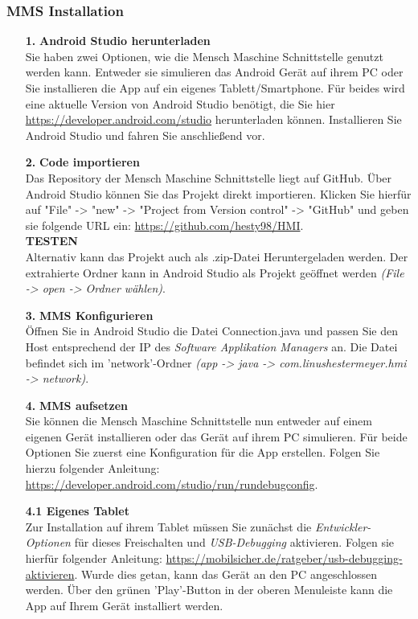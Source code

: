 \subsubsection{MMS Installation}
\begin{itemize}
	\item[\textbf{1.}] \textbf{Android Studio herunterladen}\\
	Sie haben zwei Optionen, wie die Mensch Maschine Schnittstelle genutzt werden kann. Entweder sie simulieren das Android Gerät auf ihrem PC oder Sie installieren die App auf ein eigenes Tablett/Smartphone. Für beides wird eine aktuelle Version von Android Studio benötigt, die Sie hier \url{https://developer.android.com/studio} herunterladen können. Installieren Sie Android Studio und fahren Sie anschließend vor.

	\item[\textbf{2.}] \textbf{Code importieren}\\
	Das Repository der Mensch Maschine Schnittstelle liegt auf GitHub. Über Android Studio können Sie das Projekt direkt importieren. Klicken Sie hierfür auf "File" -> "new" -> "Project from Version control" -> "GitHub" und geben sie folgende URL ein: \url{https://github.com/hesty98/HMI}.\\
	
	\textbf{TESTEN}\\
	
	Alternativ kann das Projekt auch als .zip-Datei Heruntergeladen werden. Der extrahierte Ordner kann in Android Studio als Projekt geöffnet werden \textit{(File -> open -> Ordner wählen)}.
	
	\item[\textbf{3.}] \textbf{MMS Konfigurieren}\\
	Öffnen Sie in Android Studio die Datei Connection.java und passen Sie den Host entsprechend der IP des \textit{Software Applikation Managers} an. Die Datei befindet sich im 'network'-Ordner \textit{(app -> java -> com.linushestermeyer.hmi -> network)}.
	
	\item[\textbf{4.}] \textbf{MMS aufsetzen}\\
	Sie können die Mensch Maschine Schnittstelle nun entweder auf einem eigenen Gerät installieren oder das Gerät auf ihrem PC simulieren. Für beide Optionen Sie zuerst eine Konfiguration für die App erstellen.  Folgen Sie hierzu folgender Anleitung: \url{https://developer.android.com/studio/run/rundebugconfig}.
	
		\subitem \textbf{4.1 Eigenes Tablet}\\
			Zur Installation auf ihrem Tablet müssen Sie zunächst die \textit{Entwickler-Optionen} für dieses Freischalten und \textit{USB-Debugging} aktivieren. Folgen sie hierfür folgender Anleitung: \url{https://mobilsicher.de/ratgeber/usb-debugging-aktivieren}. Wurde dies getan, kann das Gerät an den PC angeschlossen werden. Über den grünen 'Play'-Button in der oberen Menuleiste kann die App auf Ihrem Gerät installiert werden.
			

\end{itemize}
